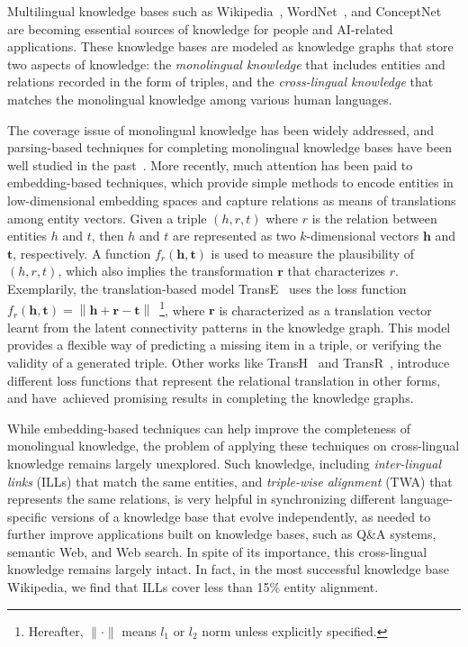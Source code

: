 \documentclass{article}
\def\st#1{~}
\begin{document}
Multilingual knowledge bases such as Wikipedia~\cite{url:wiki}, WordNet~\cite{bond2013linking}, and ConceptNet~\cite{speer2013conceptnet} are becoming essential sources of knowledge for people and AI-related applications.
These knowledge bases are modeled as knowledge graphs that store two aspects of knowledge: the {\em monolingual knowledge} that includes entities and relations recorded in the form of triples, and the {\em cross-lingual knowledge} that matches the monolingual knowledge among various human languages. \par



The coverage issue of monolingual knowledge has been widely addressed, and parsing-based techniques for completing monolingual knowledge bases have been well studied in the past~\cite{culotta2004dependency,guodong2005exploring,sun2011semi}. More recently, much attention has been paid to embedding-based techniques, which provide simple methods to encode entities in low-dimensional embedding spaces and capture relations as means of translations among entity vectors.
Given a triple $(h, r, t)$ where $r$ is the relation between entities $h$ and $t$, then $h$ and $t$ are represented as two $k$-dimensional vectors $\mathbf{h}$ and $\mathbf{t}$, respectively. A function $f_{r}(\mathbf{h},\mathbf{t})$ is used to measure the plausibility of $(h, r, t)$, which also implies the transformation $\mathbf{r}$ that characterizes $r$.
Exemplarily, the translation-based model TransE~\cite{bordes2013translating} uses the loss function $f_{r}(\mathbf{h},\mathbf{t})=\left \| \mathbf{h}+\mathbf{r}-\mathbf{t} \right \|$~\footnote{Hereafter, $\|\cdot\|$ means $l_1$ or $l_2$ norm unless explicitly specified.}, where $\mathbf{r}$ is characterized as a translation vector learnt from the latent connectivity patterns in the knowledge graph. This model provides a flexible way of predicting
a missing item in a triple, or verifying the validity of a generated triple. Other works like TransH~\cite{wang2014knowledge} and TransR~\cite{lin2015learning}, introduce different loss functions that represent the relational translation in other forms, and have\st{ already }achieved promising results in completing the knowledge graphs. \par 

While embedding-based techniques can help improve the completeness of
monolingual knowledge, the problem of applying these techniques on cross-lingual knowledge remains largely unexplored.
Such knowledge, including {\em inter-lingual links} (ILLs) that match the same entities, and {\em triple-wise alignment} (TWA) that represents the same relations, is
very helpful in synchronizing different language-specific \mbox{versions} of a knowledge base that evolve independently, as needed to further improve applications built on knowledge bases, such as Q\&A systems, semantic Web, and Web search.
In spite of its importance, this cross-lingual knowledge \mbox{remains} largely intact.
In fact, in the most successful knowledge base Wikipedia, we find that ILLs cover less than 15\% entity alignment.\par
\end{document}
